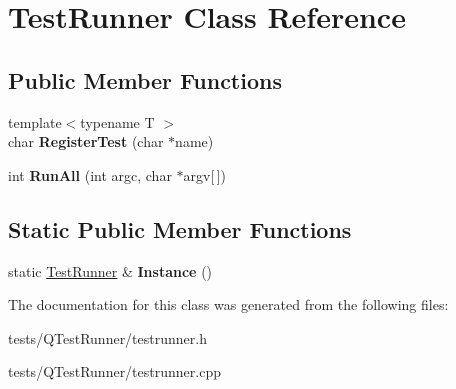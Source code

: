 \hypertarget{classTestRunner}{\section{Test\+Runner Class Reference}
\label{classTestRunner}
}
\subsection*{Public Member Functions}
\begin{DoxyCompactItemize}
\item 
\hypertarget{classTestRunner_a8f8aaa2a9d9d17ad388abfc9575dc793}{{\footnotesize template$<$typename T $>$ }\\char {\bfseries Register\+Test} (char $\ast$name)}\label{classTestRunner_a8f8aaa2a9d9d17ad388abfc9575dc793}

\item 
\hypertarget{classTestRunner_a0a247b43d9154ab88b489051d22221e3}{int {\bfseries Run\+All} (int argc, char $\ast$argv\mbox{[}$\,$\mbox{]})}\label{classTestRunner_a0a247b43d9154ab88b489051d22221e3}

\end{DoxyCompactItemize}
\subsection*{Static Public Member Functions}
\begin{DoxyCompactItemize}
\item 
\hypertarget{classTestRunner_a4707c4680c85ce622fc375efcf39fc25}{static \hyperlink{classTestRunner}{Test\+Runner} \& {\bfseries Instance} ()}\label{classTestRunner_a4707c4680c85ce622fc375efcf39fc25}

\end{DoxyCompactItemize}


The documentation for this class was generated from the following files\+:\begin{DoxyCompactItemize}
\item 
tests/\+Q\+Test\+Runner/testrunner.\+h\item 
tests/\+Q\+Test\+Runner/testrunner.\+cpp\end{DoxyCompactItemize}

